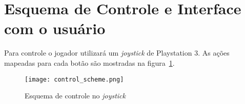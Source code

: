 \AddToShipoutPicture{\BackgroundPic}

\section*{Esquema de Controle e Interface com o usuário}

Para controle o jogador utilizará um \emph{joystick} de Playstation 3. As ações mapeadas para cada botão são mostradas na figura~\ref{control}.
 
	\begin{figure}[h]
		\center
		\texttt{[image: control\_scheme.png]}
		\caption{Esquema de controle no \emph{joystick}}
		\label{control}
	\end{figure}

